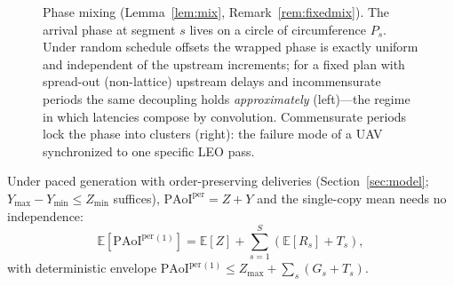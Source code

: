 \documentclass[twocolumn,3p,times,procedia]{elsarticle}
\newcommand{\PAoIper}{\mathrm{PAoI}^{\mathrm{per}}}
\newcommand{\E}{\mathbb{E}}
\begin{document}
\begin{figure}[t]
\centering
{}
\caption{Phase mixing (Lemma~\ref{lem:mix},
Remark~\ref{rem:fixedmix}). The arrival phase at
segment $s$ lives on a circle of circumference $P_s$. Under random
schedule offsets the wrapped phase is exactly uniform and independent
of the upstream increments; for a fixed plan with spread-out
(non-lattice) upstream delays and incommensurate periods the same
decoupling holds \emph{approximately} (left)---the regime in which
latencies compose by
convolution. Commensurate periods lock the phase into clusters (right):
the failure mode of a UAV synchronized to one specific LEO pass.}
\label{fig:mixing}
\end{figure}

Under paced generation with order-preserving deliveries
(Section~\ref{sec:model}; $Y_{\max}-Y_{\min}\le Z_{\min}$ suffices),
$\PAoIper=Z+Y$ and the single-copy mean needs no independence:
\begin{equation}
\E[\PAoIper{}^{(1)}]=\E[Z]+\sum_{s=1}^S(\E[R_s]+T_s),
\end{equation}
with deterministic envelope $\PAoIper{}^{(1)}\le Z_{\max}+\sum_s(G_s+T_s)$.
\end{document}
